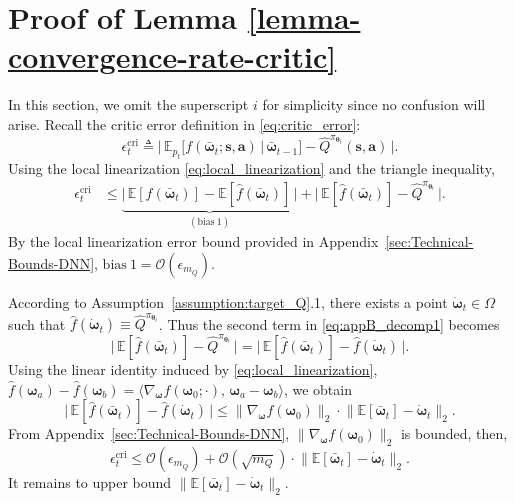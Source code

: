 \documentclass{IEEEtran}
\begin{document}
\section{Proof of Lemma \ref{lemma-convergence-rate-critic}}
\label{sec:proof-of-critic}
In this section, we omit the superscript $i$ for simplicity since no confusion will arise. Recall the critic error definition in \eqref{eq:critic_error}:
\begin{equation}
\epsilon_{t}^{\mathrm{cri}}
\triangleq\bigl|\,\mathbb{E}_{p_t}\big[f(\bar{\boldsymbol{\omega}}_{t};\boldsymbol{s},\boldsymbol{a})\,\big|\,\bar{\boldsymbol{\omega}}_{t-1}\big]-\hat Q^{\pi_{\boldsymbol{\theta}_t}}(\boldsymbol{s},\boldsymbol{a})\,\bigr|.
\end{equation}
Using the local linearization \eqref{eq:local_linearization} and the triangle inequality,
\begin{align}
\epsilon_{t}^{\mathrm{cri}}
&\le \underbrace{\bigl|\,\mathbb{E}[f(\bar{\boldsymbol{\omega}}_{t})]-\mathbb{E}[\hat f(\bar{\boldsymbol{\omega}}_{t})]\,\bigr|}_{\mathrm{(bias\ 1)}}
+\bigl|\,\mathbb{E}[\hat f(\bar{\boldsymbol{\omega}}_{t})]-\hat Q^{\pi_{\boldsymbol{\theta}_t}}\,\bigr|.
\label{eq:appB_decomp1}
\end{align}
By the local linearization error bound provided in Appendix~\ref{sec:Technical-Bounds-DNN}, $\mathrm{bias\ 1}=\mathcal{O}(\epsilon_{m_Q})$.

According to Assumption~\ref{assumption:target_Q}.1, there exists a point $\dot{\boldsymbol{\omega}}_{t}\in\Omega$ such that
$\hat f(\dot{\boldsymbol{\omega}}_{t})\equiv \hat Q^{\pi_{\boldsymbol{\theta}_t}}$.
Thus the second term in \eqref{eq:appB_decomp1} becomes
\begin{equation}
\bigl|\,\mathbb{E}[\hat f(\bar{\boldsymbol{\omega}}_{t})]-\hat Q^{\pi_{\boldsymbol{\theta}_t}}\,\bigr|
=\bigl|\,\mathbb{E}[\hat f(\bar{\boldsymbol{\omega}}_{t})]-\hat f(\dot{\boldsymbol{\omega}}_{t})\,\bigr|.
\label{eq:appB_decomp2}
\end{equation}
Using the linear identity induced by \eqref{eq:local_linearization},
$\hat f(\boldsymbol{\omega}_a)-\hat f(\boldsymbol{\omega}_b)=\langle\nabla_{\boldsymbol{\omega}}f(\boldsymbol{\omega}_0;\cdot),\,\boldsymbol{\omega}_a-\boldsymbol{\omega}_b\rangle$,
we obtain
\begin{equation}
\bigl|\,\mathbb{E}[\hat f(\bar{\boldsymbol{\omega}}_{t})]-\hat f(\dot{\boldsymbol{\omega}}_{t})\,\bigr|
\le \bigl\|\nabla_{\boldsymbol{\omega}}f(\boldsymbol{\omega}_0)\bigr\|_2\cdot\bigl\|\mathbb{E}[\bar{\boldsymbol{\omega}}_{t}]-\dot{\boldsymbol{\omega}}_{t}\bigr\|_2.
\label{eq:appB_reduce_to_param}
\end{equation}
From Appendix~\ref{sec:Technical-Bounds-DNN}, $\|\nabla_{\boldsymbol{\omega}}f(\boldsymbol{\omega}_0)\|_2$ is bounded, then,
\begin{equation}
\epsilon_{t}^{\mathrm{cri}}
\le \mathcal{O}(\epsilon_{m_Q})+\mathcal{O}(\sqrt{m_Q})\cdot\bigl\|\mathbb{E}[\bar{\boldsymbol{\omega}}_{t}]-\dot{\boldsymbol{\omega}}_{t}\bigr\|_2.
\label{eq:appB_core_goal}
\end{equation}
It remains to upper bound $\|\mathbb{E}[\bar{\boldsymbol{\omega}}_{t}]-\dot{\boldsymbol{\omega}}_{t}\|_2$.
\end{document}
